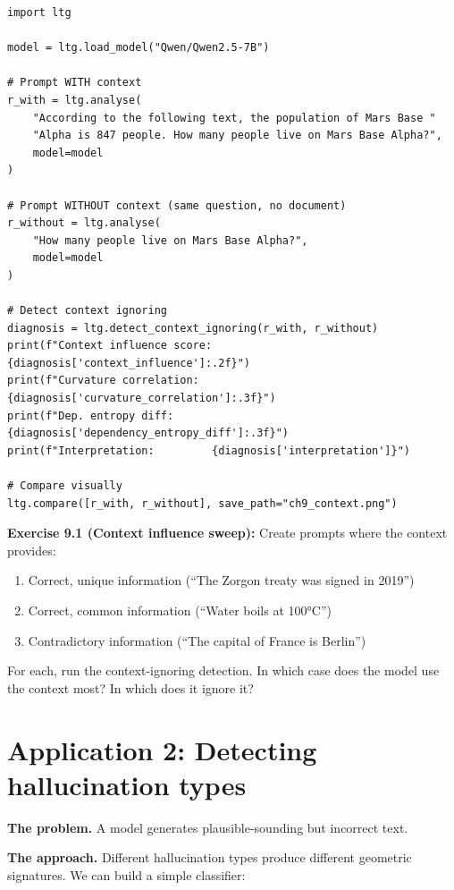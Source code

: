 \documentclass[11pt, twoside, openright]{memoir}
\begin{document}
\begin{lstlisting}[caption={Detecting context-ignoring with ltg}]
import ltg

model = ltg.load_model("Qwen/Qwen2.5-7B")

# Prompt WITH context
r_with = ltg.analyse(
    "According to the following text, the population of Mars Base "
    "Alpha is 847 people. How many people live on Mars Base Alpha?",
    model=model
)

# Prompt WITHOUT context (same question, no document)
r_without = ltg.analyse(
    "How many people live on Mars Base Alpha?",
    model=model
)

# Detect context ignoring
diagnosis = ltg.detect_context_ignoring(r_with, r_without)
print(f"Context influence score: {diagnosis['context_influence']:.2f}")
print(f"Curvature correlation:  {diagnosis['curvature_correlation']:.3f}")
print(f"Dep. entropy diff:      {diagnosis['dependency_entropy_diff']:.3f}")
print(f"Interpretation:         {diagnosis['interpretation']}")

# Compare visually
ltg.compare([r_with, r_without], save_path="ch9_context.png")
\end{lstlisting}

\begin{tryit}
\textbf{Exercise 9.1 (Context influence sweep):} Create prompts where the
context provides:
\begin{enumerate}[nosep]
\item[a)] Correct, unique information (``The Zorgon treaty was signed in 2019'')
\item[b)] Correct, common information (``Water boils at 100°C'')
\item[c)] Contradictory information (``The capital of France is Berlin'')
\end{enumerate}
For each, run the context-ignoring detection. In which case does the model
use the context most? In which does it ignore it?
\end{tryit}

\section{Application 2: Detecting hallucination types}

\textbf{The problem.} A model generates plausible-sounding but incorrect text.

\textbf{The approach.} Different hallucination types produce different
geometric signatures. We can build a simple classifier:
\end{document}
